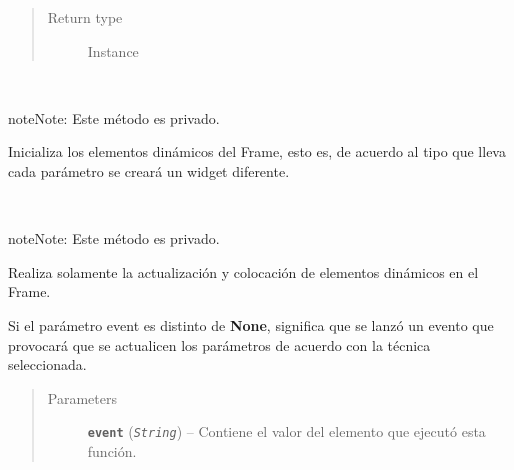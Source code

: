 \documentclass[letterpaper,10pt,english]{sphinxmanual}
\begin{document}
\begin{fulllineitems}
\begin{quote}
\begin{description}
\item[{Return type}] \leavevmode
Instance

\end{description}\end{quote}

\begin{fulllineitems}
\label{View/Main/GeneticOperator/TemplateGeneticOperator/TemplateGeneticOperatorFrame:View.Main.GeneticOperator.TemplateGeneticOperator.TemplateGeneticOperatorFrame.TemplateGeneticOperatorFrame._TemplateGeneticOperatorFrame__create_dynamic_widgets}~
\begin{notice}{note}{Note:}
Este método es privado.
\end{notice}

Inicializa los elementos dinámicos del Frame, esto es, de acuerdo al tipo 
que lleva cada parámetro se creará un widget diferente.

\end{fulllineitems}


\begin{fulllineitems}
\label{View/Main/GeneticOperator/TemplateGeneticOperator/TemplateGeneticOperatorFrame:View.Main.GeneticOperator.TemplateGeneticOperator.TemplateGeneticOperatorFrame.TemplateGeneticOperatorFrame._TemplateGeneticOperatorFrame__update_widgets}~
\begin{notice}{note}{Note:}
Este método es privado.
\end{notice}

\begin{DUlineblock}{0em}
\item[] Realiza solamente la actualización y colocación de elementos dinámicos 
en el Frame.
\item[] Si el parámetro event es distinto de \textbf{None}, significa que se lanzó 
un evento que provocará que se actualicen los parámetros de acuerdo con
la técnica seleccionada.
\end{DUlineblock}
\begin{quote}\begin{description}
\item[{Parameters}] \leavevmode
\textbf{\texttt{event}} (\emph{\texttt{String}}) -- Contiene el valor del elemento que ejecutó esta función.


\end{description}
\end{quote}
\end{fulllineitems}
\end{fulllineitems}
\end{document}
